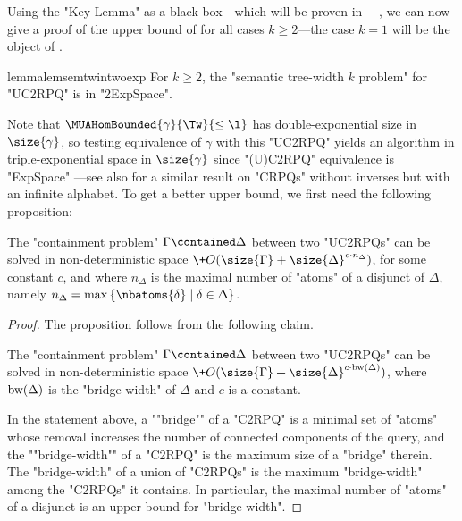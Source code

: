 Using the "Key Lemma" as a black box---which will be proven in ---, we can now give a proof of the upper bound of  for all
cases $k\geq 2$---the case $k=1$ will be the object of .
\begin{restatable}{lemma}{lemsemtwintwoexp}
    \AP\label{lem:sem-tw-in-twoexp}
    For $k \geq 2$, the "semantic tree-width $k$ problem" for "UC2RPQ" is in "2ExpSpace".
\end{restatable}
Note that $\MUAHomBounded{\gamma}{\Tw}{\leq\l}$ has double-exponential size in $\size{\gamma}$,
so testing equivalence of $\gamma$ with this "UC2RPQ" yields an algorithm in triple-exponential 
space in $\size{\gamma}$ since "(U)C2RPQ" equivalence is "ExpSpace" \cite[Theorem 5]{CGLV00}
---see also \cite[§ after Theorem 4.8]{Florescu:CRPQ} for a similar result on "CRPQs" without 
inverses but with an infinite alphabet. To get a better upper bound, we first need
the following proposition:
\begin{proposition}
	\AP\label{prop:bound-containment-pb}
    The "containment problem" $\Gamma \contained \Delta$ between two "UC2RPQs" can be solved in non-deterministic space $\+O(\size{\Gamma} + \size{\Delta}^{c \cdot {n_\Delta}})$, for some constant $c$,
	and where $n_\Delta$ is the maximal number of "atoms" of a disjunct of $\Delta$, namely $n_\Delta = \max{\{\nbatoms{\delta} \mid \delta \in \Delta\}}$. 
\end{proposition}

\begin{proof}
	The proposition follows from the following claim.
    \begin{claim}
        The "containment problem" $\Gamma \contained \Delta$ between two "UC2RPQs" can be solved in non-deterministic space $\+O(\size{\Gamma} + {\size{\Delta}}^{c \cdot \bw(\Delta)})$, where $\textrm{bw}(\Delta)$ is the "bridge-width" of $\Delta$ and $c$ is a constant.
    \end{claim}
    \AP
    In the statement above, a ""bridge"" of a "C2RPQ" is a minimal set of "atoms" whose removal increases the number of connected components of the query, and the ""bridge-width"" of a "C2RPQ" is the maximum size of a "bridge" therein. The "bridge-width" of a union of "C2RPQs" is the maximum "bridge-width" among the "C2RPQs" it contains. In particular, the maximal number
	of "atoms" of a disjunct is an upper bound for "bridge-width".
\end{proof}

